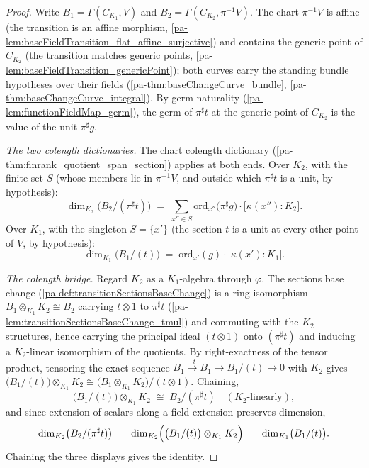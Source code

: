 \begin{proof}
  \leanok
  Write \(B_1 = \Gamma(C_{K_1}, V)\) and
  \(B_2 = \Gamma(C_{K_2}, \pi^{-1}V)\). The chart \(\pi^{-1}V\) is affine (the
  transition is an affine morphism,
  \ref{pa-lem:baseFieldTransition_flat_affine_surjective}) and contains the generic point
  of \(C_{K_2}\) (the transition matches generic points,
  \ref{pa-lem:baseFieldTransition_genericPoint}); both curves carry the standing bundle
  hypotheses over their fields (\ref{pa-thm:baseChangeCurve_bundle},
  \ref{pa-thm:baseChangeCurve_integral}). By germ naturality
  (\ref{pa-lem:functionFieldMap_germ}), the germ of \(\pi^{\sharp}t\) at the generic point
  of \(C_{K_2}\) is the value of the unit \(\pi^{\sharp}g\).

  \emph{The two colength dictionaries.} The chart colength dictionary
  (\ref{pa-thm:finrank_quotient_span_section}) applies at both ends. Over \(K_2\), with
  the finite set \(S\) (whose members lie in \(\pi^{-1}V\), and outside which
  \(\pi^{\sharp}t\) is a unit, by hypothesis):
  \[
    \dim_{K_2}\bigl(B_2/(\pi^{\sharp}t)\bigr)
      \;=\; \sum_{x'' \in S} \mathrm{ord}_{x''}\bigl(\pi^{\sharp}g\bigr)
        \cdot \bigl[\kappa(x'') : K_2\bigr].
  \]
  Over \(K_1\), with the singleton \(S = \{x'\}\) (the section \(t\) is a unit at every
  other point of \(V\), by hypothesis):
  \[
    \dim_{K_1}\bigl(B_1/(t)\bigr)
      \;=\; \mathrm{ord}_{x'}(g) \cdot \bigl[\kappa(x') : K_1\bigr].
  \]

  \emph{The colength bridge.} Regard \(K_2\) as a \(K_1\)-algebra through \(\varphi\).
  The sections base change (\ref{pa-def:transitionSectionsBaseChange}) is a ring
  isomorphism \(B_1 \otimes_{K_1} K_2 \cong B_2\) carrying \(t \otimes 1\) to
  \(\pi^{\sharp}t\) (\ref{pa-lem:transitionSectionsBaseChange_tmul}) and commuting with
  the \(K_2\)-structures, hence carrying the principal ideal \((t \otimes 1)\) onto
  \((\pi^{\sharp}t)\) and inducing a \(K_2\)-linear isomorphism of the quotients. By
  right-exactness of the tensor product, tensoring the exact sequence
  \(B_1 \xrightarrow{\,\cdot t\,} B_1 \to B_1/(t) \to 0\) with \(K_2\) gives
  \(\bigl(B_1/(t)\bigr) \otimes_{K_1} K_2 \cong
  \bigl(B_1 \otimes_{K_1} K_2\bigr)/(t \otimes 1)\). Chaining,
  \[
    \bigl(B_1/(t)\bigr) \otimes_{K_1} K_2 \;\cong\; B_2/(\pi^{\sharp}t)
    \quad (K_2\text{-linearly}),
  \]
  and since extension of scalars along a field extension preserves dimension,
  \[
    \dim_{K_2}\bigl(B_2/(\pi^{\sharp}t)\bigr)
      \;=\; \dim_{K_2}\Bigl(\bigl(B_1/(t)\bigr) \otimes_{K_1} K_2\Bigr)
      \;=\; \dim_{K_1}\bigl(B_1/(t)\bigr).
  \]
  Chaining the three displays gives the identity.
\end{proof}

